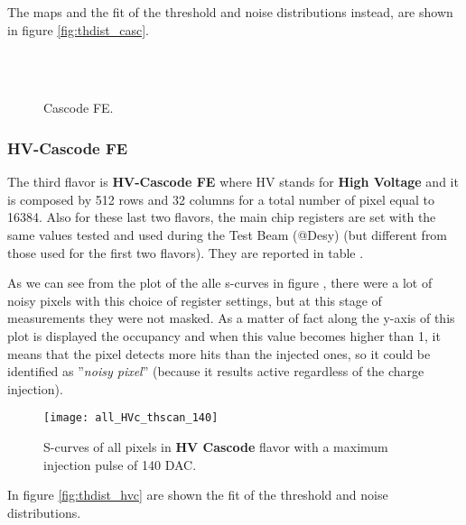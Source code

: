 The maps and the fit of the threshold and noise distributions instead, are shown in figure \vref{fig:thdist_casc}.


\begin{figure}[h!]
\centering
{}\quad
{}\\
\quad
{}\\
\caption{Cascode FE.}
\label{fig:thdist_casc}
\end{figure}



\subsubsection{HV-Cascode FE}


The third flavor is \textbf{HV-Cascode FE} where HV stands for \textbf{High Voltage} and it is composed by 512 rows and 32 columns for a total number of pixel equal to 16384. Also for these last two flavors, the main chip registers are set with the same values tested and used during the Test Beam (@Desy) (but different from those used for the first two flavors). They are reported in table  .

As we can see from the plot of the alle s-curves in figure , there were a lot of noisy pixels with this choice of register settings, but at this stage of measurements they were not masked.
As a matter of fact along the y-axis of this plot is displayed the occupancy and when this value becomes higher than 1, it means that the pixel detects more hits than the injected ones, so it could be identified as ''\textit{noisy pixel}'' (because it results active regardless of the charge injection).


\begin{figure}[h!]
\centering
\texttt{[image: all\_HVc\_thscan\_140]}
\caption{S-curves of all pixels in \textbf{HV Cascode} flavor with a maximum injection pulse of 140 DAC.}
\label{fig:hvc_scurve_140}
\end{figure}

In figure \vref{fig:thdist_hvc} are shown the fit of the threshold and noise distributions.


